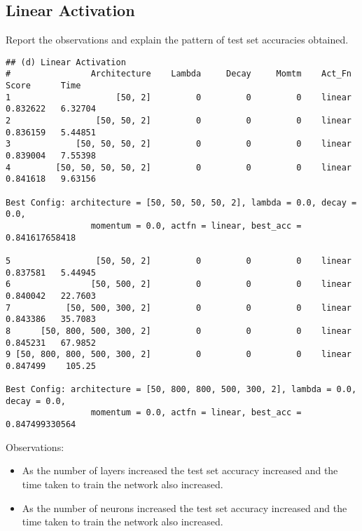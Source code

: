 \documentclass[letter,doc,notimes]{article}
\begin{document}
\subsection{Linear Activation}
Report the observations and explain the pattern of test set accuracies obtained.
\begin{verbatim}
## (d) Linear Activation
#                Architecture    Lambda     Decay     Momtm    Act_Fn     Score      Time
1                     [50, 2]         0         0         0    linear  0.832622   6.32704
2                 [50, 50, 2]         0         0         0    linear  0.836159   5.44851
3             [50, 50, 50, 2]         0         0         0    linear  0.839004   7.55398
4         [50, 50, 50, 50, 2]         0         0         0    linear  0.841618   9.63156

Best Config: architecture = [50, 50, 50, 50, 2], lambda = 0.0, decay = 0.0,
                 momentum = 0.0, actfn = linear, best_acc = 0.841617658418

5                 [50, 50, 2]         0         0         0    linear  0.837581   5.44945
6                [50, 500, 2]         0         0         0    linear  0.840042   22.7603
7           [50, 500, 300, 2]         0         0         0    linear  0.843386   35.7083
8      [50, 800, 500, 300, 2]         0         0         0    linear  0.845231   67.9852
9 [50, 800, 800, 500, 300, 2]         0         0         0    linear  0.847499    105.25

Best Config: architecture = [50, 800, 800, 500, 300, 2], lambda = 0.0, decay = 0.0,
                 momentum = 0.0, actfn = linear, best_acc = 0.847499330564
\end{verbatim}
Observations:
\begin{itemize}
	\item As the number of layers increased the test set accuracy increased and the time taken to train the network also increased.
	\item As the number of neurons increased the test set accuracy increased and the time taken to train the network also increased.
\end{itemize}
\end{document}
